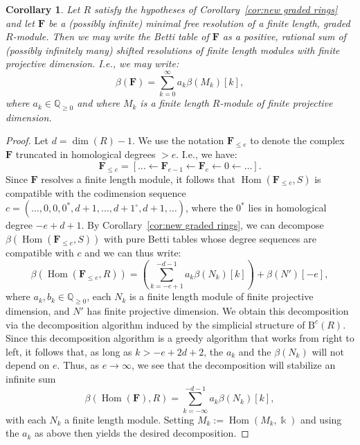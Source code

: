 \documentclass[12pt]{amsart}
\newtheorem{cor}[lemma]{Corollary}
\theoremstyle{definition}
\theoremstyle{remark}
\newtheorem{example}[lemma]{Example}
\newcommand{\Hom}{\operatorname{Hom}} %
\newcommand{\kk}{\Bbbk}
\newcommand{\QQ}{\mathbb{Q}}
\newcommand{\bb}{c}
\newcommand{\FF}{\mathbf{F}}
\newcommand{\zp}{\circ}
\newcommand{\BBQ}{\mathrm{B}}
\begin{document}
\begin{cor}\label{cor:decomp infinite}
Let $R$ satisfy the hypotheses of Corollary~\ref{cor:new graded rings} and let $\FF$ be a (possibly infinite) minimal free resolution of a finite length, graded $R$-module.  Then we may write the Betti table of $\FF$ as a positive, rational sum of (possibly infinitely many) shifted resolutions of finite length modules with finite projective dimension.  I.e., we may write:
\[
\beta(\FF)=\sum_{k=0}^\infty a_k\beta(M_k)[k],
\]
where $a_k\in \QQ_{\geq 0}$ and where $M_k$ is a finite length $R$-module of finite projective dimension.
\end{cor}
\begin{proof}
Let $d=\dim(R)-1$.  We use the notation $\FF_{\leq e}$ to denote the complex $\FF$ truncated in homological degrees $>e$.  I.e., we have:
\[
\FF_{\leq e}=[\dots \gets \FF_{e-1}\gets \FF_e \gets 0 \gets \dots].
\]
Since $\FF$ resolves a finite length module, it follows that $\Hom(\FF_{\leq e},S)$ is compatible with the codimension sequence $\bb=(\dots,0,0,0^*,d+1,\dots, d+1^\zp, d+1,\dots)$, where the $0^*$ lies in homological degree $-e+d+1$.  By Corollary~\ref{cor:new graded rings}, we can decompose $\beta(\Hom(\FF_{\leq e},S))$ with pure Betti tables whose degree sequences are compatible with $\bb$ and we can thus write:
\[
\beta(\Hom(\FF_{\leq e},R))=\left(\sum_{k=-e+1}^{-d-1} a_k\beta(N_k)[k]\right)+\beta(N')[-e],
\]
where $a_k,b_k\in \QQ_{\geq 0}$, each $N_k$ is a finite length module of finite projective dimension, and $N'$ has finite projective dimension.  We obtain this decomposition via the decomposition algorithm induced by the simplicial structure of $\BBQ^{\bb}(R)$.  Since this decomposition algorithm is a greedy algorithm that works from right to left, it follows that, as long as $k>-e+2d+2$, the $a_k$ and the $\beta(N_k)$ will not depend on $e$.  Thus, as $e\to \infty$, we see that the decomposition will stabilize an infinite sum
\[
\beta(\Hom(\FF),R)=\sum_{k=-\infty}^{-d-1} a_k\beta(N_k)[k],
\]
with each $N_k$ a finite length module.  Setting $M_k:=\Hom(M_k,\kk)$ and using the $a_k$ as above then yields the desired decomposition.
\end{proof}
%
\end{document}
